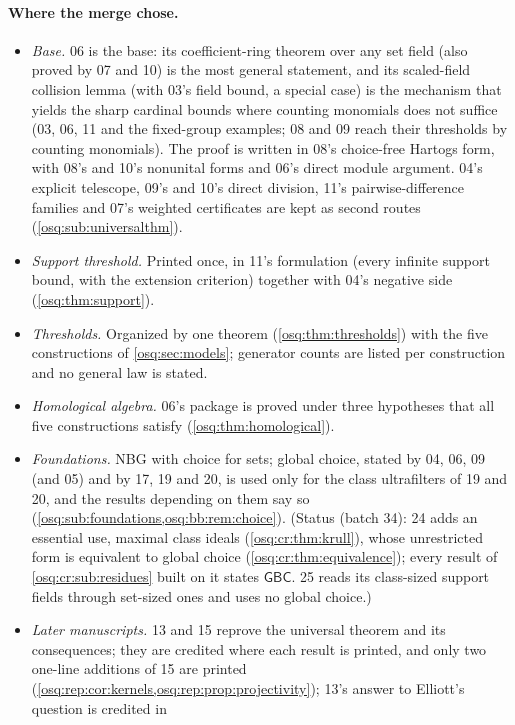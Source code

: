 \documentclass[11pt,letterpaper]{article}
\numberwithin{equation}{section}
\theoremstyle{definition}
\theoremstyle{remark}
\theoremstyle{plain}
\begin{document}
\paragraph{Where the merge chose.}
\begin{itemize}
\item \emph{Base.} 06 is the base: its coefficient-ring theorem over any set field (also
proved by 07 and 10) is the most general statement, and its scaled-field collision lemma (with
03's field bound, a special case) is the mechanism that yields the sharp cardinal bounds where
counting monomials does not suffice (03, 06, 11 and the fixed-group examples; 08 and 09 reach
their thresholds by counting monomials). The proof is written in 08's
choice-free Hartogs form, with 08's and 10's nonunital forms and 06's direct module argument.
04's explicit telescope, 09's and 10's direct division, 11's pairwise-difference families and 07's
weighted certificates are kept as second routes (\cref{osq:sub:universalthm}).
\item \emph{Support threshold.} Printed once, in 11's formulation (every infinite support bound,
with the extension criterion) together with 04's negative side (\cref{osq:thm:support}).
\item \emph{Thresholds.} Organized by one theorem (\cref{osq:thm:thresholds}) with the five
constructions of \cref{osq:sec:models}; generator counts are listed per construction and no
general law is stated.
\item \emph{Homological algebra.} 06's package is proved under three hypotheses that all five
constructions satisfy (\cref{osq:thm:homological}).
\item \emph{Foundations.} NBG with choice for sets; global choice, stated by 04, 06, 09 (and 05) and
by 17, 19 and 20, is used only for the class ultrafilters of 19 and 20, and the results depending on them say so
(\cref{osq:sub:foundations,osq:bb:rem:choice}). (Status (batch 34): 24 adds an essential use, maximal class ideals
(\cref{osq:cr:thm:krull}), whose unrestricted form is equivalent to global choice (\cref{osq:cr:thm:equivalence}); every result of
\cref{osq:cr:sub:residues} built on it states $\mathsf{GBC}$. 25 reads its class-sized support fields through set-sized ones and uses no global choice.)
\item \emph{Later manuscripts.} 13 and 15 reprove the universal theorem and its consequences; they are
credited where each result is printed, and only two one-line additions of 15 are printed
(\cref{osq:rep:cor:kernels,osq:rep:prop:projectivity}); 13's answer to Elliott's question is credited in

\end{itemize}
\end{document}
